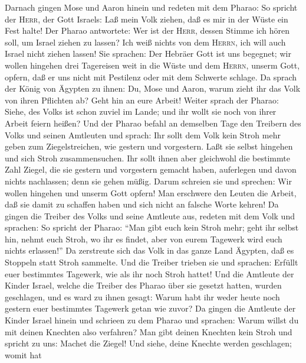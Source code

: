  Darnach gingen Mose und Aaron hinein und redeten mit dem
Pharao: So spricht der \textsc{Herr}, der Gott Israels: Laß mein Volk
ziehen, daß es mir in der Wüste ein Fest halte!  Der
Pharao antwortete: Wer ist der \textsc{Herr}, dessen Stimme ich hören
soll, um Israel ziehen zu lassen? Ich weiß nichts von dem
\textsc{Herrn}, ich will auch Israel nicht ziehen lassen! 
Sie sprachen: Der Hebräer Gott ist uns begegnet; wir wollen hingehen
drei Tagereisen weit in die Wüste und dem \textsc{Herrn}, unserm Gott,
opfern, daß er uns nicht mit Pestilenz oder mit dem Schwerte schlage.
 Da sprach der König von Ägypten zu ihnen: Du, Mose und
Aaron, warum zieht ihr das Volk von ihren Pflichten ab? Geht hin an eure
Arbeit!  Weiter sprach der Pharao: Siehe, des Volks ist
schon zuviel im Lande; und ihr wollt sie noch von ihrer Arbeit feiern
heißen?  Und der Pharao befahl an demselben Tage den
Treibern des Volks und seinen Amtleuten und sprach:  Ihr
sollt dem Volk kein Stroh mehr geben zum Ziegelstreichen, wie gestern
und vorgestern. Laßt sie selbst hingehen und sich Stroh zusammensuchen.
 Ihr sollt ihnen aber gleichwohl die bestimmte Zahl
Ziegel, die sie gestern und vorgestern gemacht haben, auferlegen und
davon nichts nachlassen; denn sie gehen müßig. Darum schreien sie und
sprechen: Wir wollen hingehen und unserm Gott opfern!  Man
erschwere den Leuten die Arbeit, daß sie damit zu schaffen haben und
sich nicht an falsche Worte kehren!  Da gingen die
Treiber des Volks und seine Amtleute aus, redeten mit dem Volk und
sprachen: So spricht der Pharao: ``Man gibt euch kein Stroh mehr;
 geht ihr selbst hin, nehmt euch Stroh, wo ihr es findet,
aber von eurem Tagewerk wird euch nichts erlassen!''  Da
zerstreute sich das Volk in das ganze Land Ägypten, daß es Stoppeln
statt Stroh sammelte.  Und die Treiber trieben sie und
sprachen: Erfüllt euer bestimmtes Tagewerk, wie als ihr noch Stroh
hattet!  Und die Amtleute der Kinder Israel, welche die
Treiber des Pharao über sie gesetzt hatten, wurden geschlagen, und es
ward zu ihnen gesagt: Warum habt ihr weder heute noch gestern euer
bestimmtes Tagewerk getan wie zuvor?  Da gingen die
Amtleute der Kinder Israel hinein und schrieen zu dem Pharao und
sprachen: Warum willst du mit deinen Knechten also verfahren?
 Man gibt deinen Knechten kein Stroh und spricht zu uns:
Machet die Ziegel! Und siehe, deine Knechte werden geschlagen; womit hat
